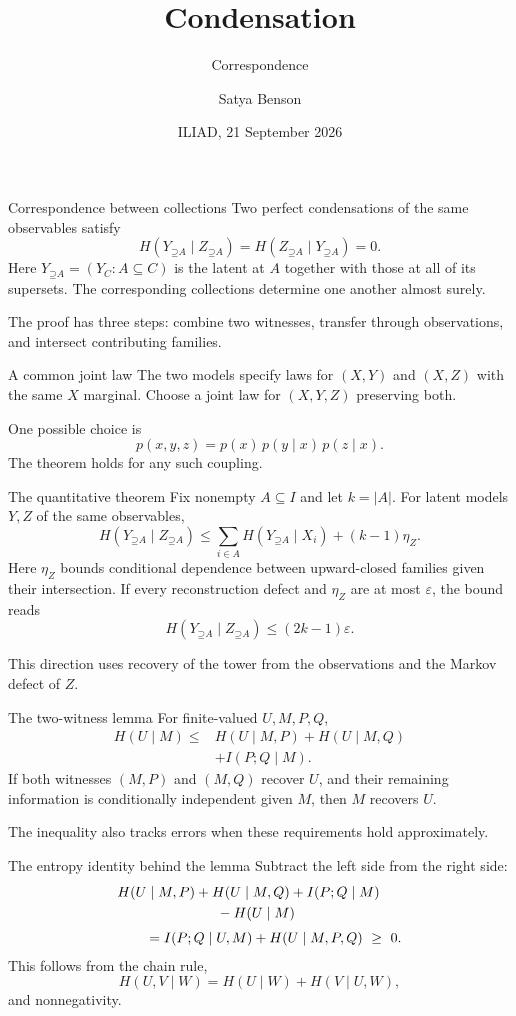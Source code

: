 \documentclass[aspectratio=169,12pt]{beamer}
\title{Condensation}
\subtitle{Correspondence}
\author{Satya Benson}
\date{ILIAD, 21 September 2026}
\newcommand{\Up}{\mathord{\supseteq}}
\begin{document}
\begin{frame}{Correspondence between collections}
Two perfect condensations of the same observables satisfy
\[
H(Y_{\Up A}\mid Z_{\Up A})=H(Z_{\Up A}\mid Y_{\Up A})=0.
\]
Here $Y_{\Up A}=(Y_C:A\subseteq C)$ is the latent at $A$ together with those
at all of its supersets. The corresponding collections determine one another
almost surely.
\medskip

The proof has three steps: combine two witnesses, transfer through observations,
and intersect contributing families.
\end{frame}

\begin{frame}{A common joint law}
The two models specify laws for $(X,Y)$ and $(X,Z)$ with the same $X$ marginal.
Choose a joint law for $(X,Y,Z)$ preserving both.
\medskip

One possible choice is
\[
p(x,y,z)=p(x)\,p(y\mid x)\,p(z\mid x).
\]
The theorem holds for any such coupling.
\end{frame}

\begin{frame}{The quantitative theorem}
Fix nonempty $A\subseteq I$ and let $k=|A|$.
For latent models $Y,Z$ of the same observables,
\[
H(Y_{\Up A}\mid Z_{\Up A})
\le \sum_{i\in A}H(Y_{\Up A}\mid X_i)+(k-1)\eta_Z.
\]
Here $\eta_Z$ bounds conditional dependence between upward-closed families
given their intersection. If every reconstruction defect and $\eta_Z$ are at
most $\varepsilon$, the bound reads
\[
H(Y_{\Up A}\mid Z_{\Up A})\le(2k-1)\varepsilon .
\]

This direction uses recovery of the tower from the observations and the
Markov defect of $Z$.
\end{frame}



\begin{frame}{The two-witness lemma}
For finite-valued $U,M,P,Q$,
\[
\begin{aligned}
H(U\mid M)\le{}&H(U\mid M,P)+H(U\mid M,Q)\\
&+I(P;Q\mid M).
\end{aligned}
\]
If both witnesses $(M,P)$ and $(M,Q)$ recover $U$, and their remaining
information is conditionally independent given $M$, then $M$ recovers $U$.
\medskip

The inequality also tracks errors when these requirements hold approximately.
\end{frame}

\begin{frame}{The entropy identity behind the lemma}
Subtract the left side from the right side:
\[
\begin{aligned}
&H(U\mid M,P)+H(U\mid M,Q)+I(P;Q\mid M)\\
&\hspace{25mm}-H(U\mid M)\\[1mm]
&\qquad=I(P;Q\mid U,M)+H(U\mid M,P,Q)\ \ge\ 0.
\end{aligned}
\]
This follows from the chain rule,
\[
H(U,V\mid W)=H(U\mid W)+H(V\mid U,W),
\]
and nonnegativity.
\end{frame}
\end{document}
